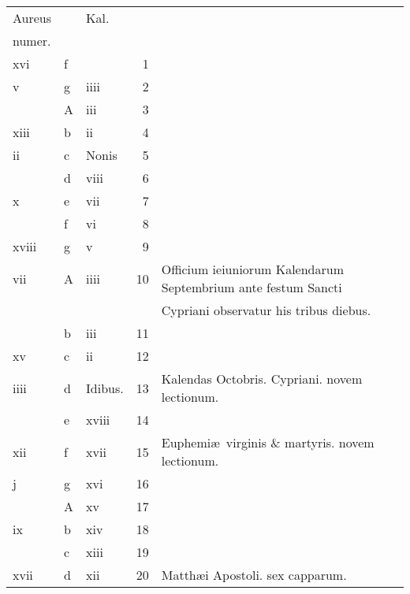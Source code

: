 \documentclass[11pt,openany]{book}
\begin{document}
\begin{center}
\begin{tabular}{l | l | l | r | l r}
\color{Red}Aureus & & \color{Red} Kal. & & \color{Red} \\
\color{Red}numer. & & & & \color{Red} \\
\color{Red} xvi & f & & 1 & & \color{Red} \\
\color{Red} v & g & \color{Red} iiii & 2 & & \color{Red} \\
\color{Red}  & \color{Red} A & \color{Red} iii & 3 & & \color{Red} \\
\color{Red} xiii & b & \color{Red} ii & 4 & & \color{Red} \\
\color{Red} ii & c & Nonis & 5 & & \color{Red} \\
\color{Red}  & d & \color{Red} viii & 6 & & \color{Red} \\
\color{Red} x & e & \color{Red} vii & 7 & & \color{Red} \\
\color{Red}  & f & \color{Red} vi & 8 & & \color{Red} \\
\color{Red} xviii & g & \color{Red} v & 9 & & \color{Red} \\
\color{Red} vii & \color{Red} A & \color{Red} iiii & 10 & Officium ieiuniorum Kalendarum Septembrium ante festum Sancti & \color{Red} \\
\color{Red}  & & & & \quad Cypriani observatur his tribus diebus. & \color{Red} \\
\color{Red}  & b & \color{Red} iii & 11 & & \color{Red} \\
\color{Red} xv & c & \color{Red} ii & 12 & & \color{Red} \\
\color{Red} iiii & d & Idibus. & 13 & \qquad \color{Red} Kalendas Octobris. \color{black} Cypriani. \color{Red} novem lectionum. & \color{Red} \\
\color{Red}  & e & \color{Red} xviii & 14 & & \color{Red} \\
\color{Red} xii & f & \color{Red} xvii & 15 & Euphemi\ae \ virginis \& martyris. \color{Red} novem lectionum. & \color{Red} \\
\color{Red} j & g & \color{Red} xvi & 16 & & \color{Red} \\
\color{Red}  & \color{Red} A & \color{Red} xv & 17 & & \color{Red} \\
\color{Red} ix & b & \color{Red} xiv & 18 & & \color{Red} \\
\color{Red}  & c & \color{Red} xiii & 19 & & \color{Red} \\
\color{Red} xvii & d & \color{Red} xii & 20 & \color{Red} Matth\ae i Apostoli. \color{black} sex capparum. & \color{Red} \\

\end{tabular}
\end{center}
\end{document}
